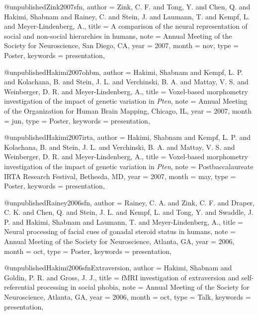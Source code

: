 @unpublished{Zink2007sfn,
  author   = {Zink, C. F. and Tong, Y. and Chen, Q. and Hakimi, Shabnam
              and Rainey, C. and Stein, J. and Laumann, T. and Kempf, L.
              and Meyer-Lindenberg, A.},
  title    = {A comparison of the neural representation of social and
              non-social hierarchies in humans},
  note     = {Annual Meeting of the Society for Neuroscience,
              San Diego, CA},
  year     = {2007},
  month    = nov,
  type     = {Poster},
  keywords = {presentation},
}

@unpublished{Hakimi2007ohbm,
  author   = {Hakimi, Shabnam and Kempf, L. P. and Kolachana, B.
              and Stein, J. L. and Verchinski, B. A. and Mattay, V. S.
              and Weinberger, D. R. and Meyer-Lindenberg, A.},
  title    = {Voxel-based morphometry investigation of the impact of
              genetic variation in \textit{Pten}},
  note     = {Annual Meeting of the Organization for Human Brain Mapping,
              Chicago, IL},
  year     = {2007},
  month    = jun,
  type     = {Poster},
  keywords = {presentation},
}

@unpublished{Hakimi2007irta,
  author   = {Hakimi, Shabnam and Kempf, L. P. and Kolachana, B.
              and Stein, J. L. and Verchinski, B. A. and Mattay, V. S.
              and Weinberger, D. R. and Meyer-Lindenberg, A.},
  title    = {Voxel-based morphometry investigation of the impact of
              genetic variation in \textit{Pten}},
  note     = {Postbaccalaureate IRTA Research Festival, Bethesda, MD},
  year     = {2007},
  month    = may,
  type     = {Poster},
  keywords = {presentation},
}


@unpublished{Rainey2006sfn,
  author   = {Rainey, C. A. and Zink, C. F. and Draper, C. K.
              and Chen, Q. and Stein, J. L. and Kempf, L. and Tong, Y.
              and Swaddle, J. P. and Hakimi, Shabnam and Laumann, T.
              and Meyer-Lindenberg, A.},
  title    = {Neural processing of facial cues of gonadal steroid status
              in humans},
  note     = {Annual Meeting of the Society for Neuroscience, Atlanta, GA},
  year     = {2006},
  month    = oct,
  type     = {Poster},
  keywords = {presentation},
}

@unpublished{Hakimi2006sfnExtraversion,
  author   = {Hakimi, Shabnam and Goldin, P. R. and Gross, J. J.},
  title    = {{fMRI} investigation of extraversion and self-referential
              processing in social phobia},
  note     = {Annual Meeting of the Society for Neuroscience, Atlanta, GA},
  year     = {2006},
  month    = oct,
  type     = {Talk},
  keywords = {presentation},
}


